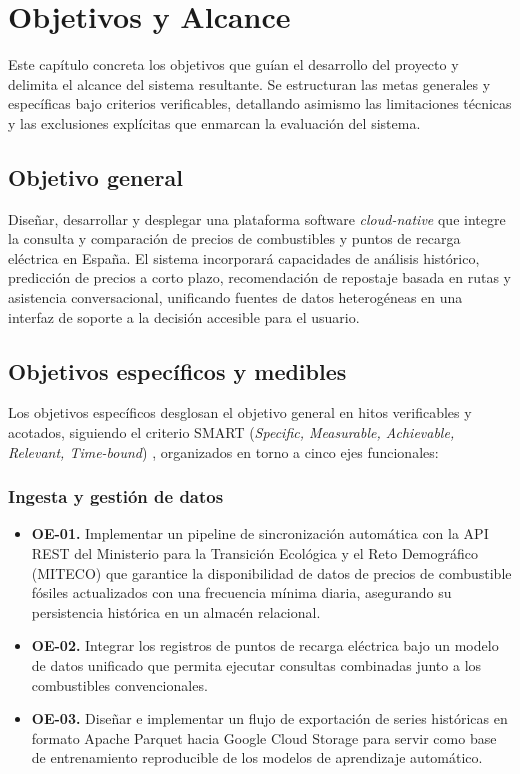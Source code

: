 \chapter{Objetivos y Alcance}

Este capítulo concreta los objetivos que guían el desarrollo del proyecto y delimita el alcance del sistema resultante.
Se estructuran las metas generales y específicas bajo criterios verificables, detallando asimismo las
limitaciones técnicas y las exclusiones explícitas que enmarcan la evaluación del sistema.

\section{Objetivo general}

Diseñar, desarrollar y desplegar una plataforma software \textit{cloud-native}
que integre la consulta y comparación de precios de combustibles y puntos de recarga
eléctrica en España. El sistema incorporará capacidades de análisis histórico, predicción de
precios a corto plazo, recomendación de repostaje basada en rutas y asistencia conversacional,
unificando fuentes de datos heterogéneas en una interfaz de soporte a la decisión accesible para el usuario.

\section{Objetivos específicos y medibles}
Los objetivos específicos desglosan el objetivo general en hitos verificables y acotados,
siguiendo el criterio SMART (\textit{Specific, Measurable, Achievable, Relevant, Time-bound}) \cite{Doran1981}, organizados en torno a cinco ejes funcionales:

\subsection{Ingesta y gestión de datos}

\begin{itemize}
      \item \textbf{OE-01.} Implementar un pipeline de sincronización automática
            con la API REST del Ministerio para la Transición Ecológica y el Reto Demográfico (MITECO) que garantice la
            disponibilidad de datos de precios de combustible fósiles actualizados con una frecuencia mínima
            diaria, asegurando su persistencia histórica en un almacén relacional.

      \item \textbf{OE-02.} Integrar los registros de puntos de recarga eléctrica bajo
            un modelo de datos unificado que permita ejecutar consultas combinadas
            junto a los combustibles convencionales.

      \item \textbf{OE-03.} Diseñar e implementar un flujo de exportación de
            series históricas en formato Apache Parquet hacia Google Cloud Storage
            para servir como base de entrenamiento reproducible de los modelos de aprendizaje automático.
\end{itemize}

